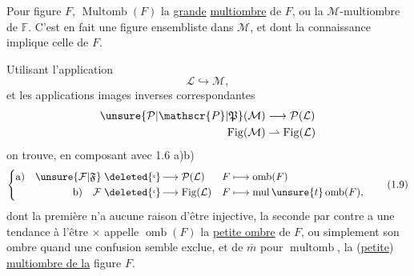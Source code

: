 
Pour  figure $F$, $\operatorname{Multomb}(F)$   la \uline{grande} \uline{multiombre} de $F$, ou la $\mathcal{M}$-multiombre de $\mathbb{F}$.  C'est en fait une figure ensembliste dans $\mathcal{M}$, et dont la connaissance implique celle de $F$.

 Utilisant   l'application
\[
\mathcal{L}\hookrightarrow\mathcal{M},
\]
et les applications images inverses correspondantes
\[
\begin{aligned}
\unsure{\mathcal{P}|\mathscr{P}|\mathfrak{P}}(\mathcal{M})&\longrightarrow\mathcal{P}(\mathcal{L})\\
\operatorname{Fig}(\mathcal{M})&\rightharpoonup\operatorname{Fig}(\mathcal{L})
\end{aligned}
\]
on trouve, en composant avec 1.6 a)b)
\[
\left\{\begin{aligned}
\text{a)}\quad \unsure{\mathcal{F}|\mathfrak{F}}&\mathrel{\deleted{\lhook}\!\longrightarrow}\mathcal{P}(\mathcal{L})&
 F&\longmapsto\operatorname{omb}(F)\\
\text{b)}\quad \mathcal{F}&\mathrel{\deleted{\lhook}\!\longrightarrow}\operatorname{Fig}(\mathcal{L})&
 F&\longmapsto\operatorname{mul}\unsure{t}\operatorname{omb}(F),
\end{aligned}\right.\tag*{(1.9)}
\]
dont la première n'a aucune raison d'être injective, la seconde par contre a une tendance à l'être $\times$   appelle $\operatorname{omb}(F)$ la \uline{petite ombre} de $F$, ou simplement son ombre quand une confusion semble exclue, et de $\overline m$ pour $\operatorname{multomb}$, la (\uline{petite}) \uline{multiombre de la} figure $F$.
